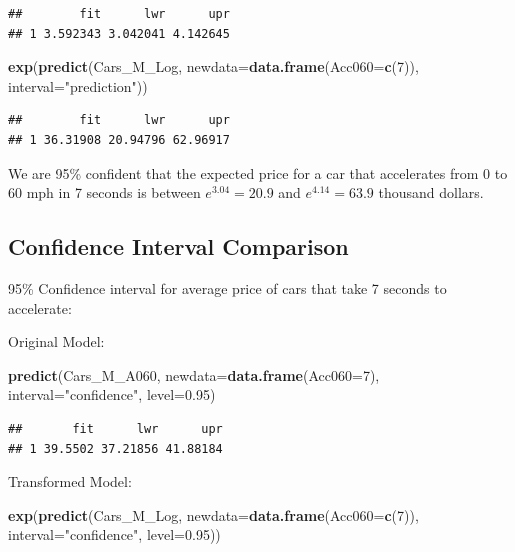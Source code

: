 \documentclass[]{book}
\newenvironment{Shaded}{\begin{snugshade}}{\end{snugshade}}
\newcommand{\KeywordTok}[1]{\textcolor[rgb]{0.13,0.29,0.53}{\textbf{#1}}}
\newcommand{\DataTypeTok}[1]{\textcolor[rgb]{0.13,0.29,0.53}{#1}}
\newcommand{\DecValTok}[1]{\textcolor[rgb]{0.00,0.00,0.81}{#1}}
\newcommand{\FloatTok}[1]{\textcolor[rgb]{0.00,0.00,0.81}{#1}}
\newcommand{\StringTok}[1]{\textcolor[rgb]{0.31,0.60,0.02}{#1}}
\newcommand{\NormalTok}[1]{#1}
\begin{document}
\begin{verbatim}
##        fit      lwr      upr
## 1 3.592343 3.042041 4.142645
\end{verbatim}

\begin{Shaded}
\begin{Highlighting}[]
\KeywordTok{exp}\NormalTok{(}\KeywordTok{predict}\NormalTok{(Cars_M_Log, }\DataTypeTok{newdata=}\KeywordTok{data.frame}\NormalTok{(}\DataTypeTok{Acc060=}\KeywordTok{c}\NormalTok{(}\DecValTok{7}\NormalTok{)), }\DataTypeTok{interval=}\StringTok{"prediction"}\NormalTok{))}
\end{Highlighting}
\end{Shaded}

\begin{verbatim}
##        fit      lwr      upr
## 1 36.31908 20.94796 62.96917
\end{verbatim}

We are 95\% confident that the expected price for a car that accelerates
from 0 to 60 mph in 7 seconds is between \(e^{3.04} =20.9\) and
\(e^{4.14}=63.9\) thousand dollars.

\subsection{Confidence Interval
Comparison}\label{confidence-interval-comparison}

95\% Confidence interval for average price of cars that take 7 seconds
to accelerate:

Original Model:

\begin{Shaded}
\begin{Highlighting}[]
\KeywordTok{predict}\NormalTok{(Cars_M_A060, }\DataTypeTok{newdata=}\KeywordTok{data.frame}\NormalTok{(}\DataTypeTok{Acc060=}\DecValTok{7}\NormalTok{), }\DataTypeTok{interval=}\StringTok{"confidence"}\NormalTok{, }\DataTypeTok{level=}\FloatTok{0.95}\NormalTok{)}
\end{Highlighting}
\end{Shaded}

\begin{verbatim}
##       fit      lwr      upr
## 1 39.5502 37.21856 41.88184
\end{verbatim}

Transformed Model:

\begin{Shaded}
\begin{Highlighting}[]
\KeywordTok{exp}\NormalTok{(}\KeywordTok{predict}\NormalTok{(Cars_M_Log, }\DataTypeTok{newdata=}\KeywordTok{data.frame}\NormalTok{(}\DataTypeTok{Acc060=}\KeywordTok{c}\NormalTok{(}\DecValTok{7}\NormalTok{)), }\DataTypeTok{interval=}\StringTok{"confidence"}\NormalTok{, }\DataTypeTok{level=}\FloatTok{0.95}\NormalTok{))}
\end{Highlighting}
\end{Shaded}
\end{document}
